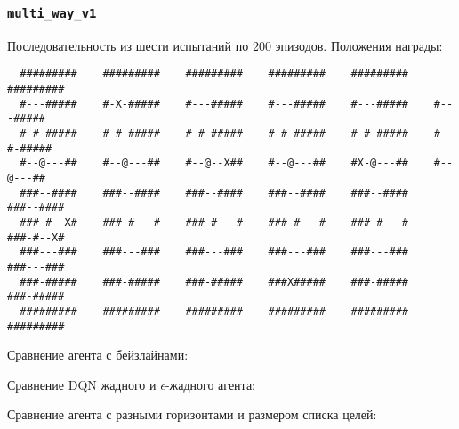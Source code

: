 \documentclass[a4paper]{article}
\begin{document}
\subsubsection{\texttt{multi\_way\_v1}}

Последовательность из шести испытаний по 200 эпизодов. Положения награды:

\begin{verbatim}
  #########    #########    #########    #########    #########    #########
  #---#####    #-X-#####    #---#####    #---#####    #---#####    #---#####
  #-#-#####    #-#-#####    #-#-#####    #-#-#####    #-#-#####    #-#-#####
  #--@---##    #--@---##    #--@--X##    #--@---##    #X-@---##    #--@---##
  ###--####    ###--####    ###--####    ###--####    ###--####    ###--####
  ###-#--X#    ###-#---#    ###-#---#    ###-#---#    ###-#---#    ###-#--X#
  ###---###    ###---###    ###---###    ###---###    ###---###    ###---###
  ###-#####    ###-#####    ###-#####    ###X#####    ###-#####    ###-#####
  #########    #########    #########    #########    #########    #########
\end{verbatim}

Сравнение агента с бейзлайнами:


Сравнение DQN жадного и $\epsilon$-жадного агента:


Сравнение агента с разными горизонтами и размером списка целей:

  

  

  
\end{document}
